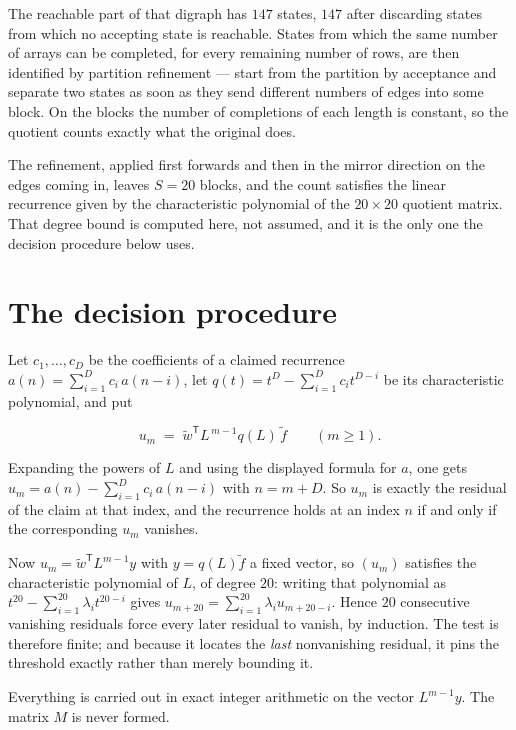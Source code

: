 \documentclass[11pt]{article}
\theoremstyle{definition}
\begin{document}
The reachable part of that digraph has $147$ states, $147$ after discarding states from which no accepting state is reachable. States from which the same number of arrays can be completed, for every remaining number of rows, are then identified by partition refinement --- start from the partition by acceptance and separate two states as soon as they send different numbers of edges into some block. On the blocks the number of completions of each length is constant, so the quotient counts exactly what the original does.

The refinement, applied first forwards and then in the mirror direction on the edges coming in, leaves $S = 20$ blocks, and the count satisfies the linear recurrence given by the characteristic polynomial of the $20 \times 20$ quotient matrix. That degree bound is computed here, not assumed, and it is the only one the decision procedure below uses.

\section{The decision procedure}

Let $c_1,\dots,c_D$ be the coefficients of a claimed recurrence $a(n) = \sum_{i=1}^{D} c_i\,a(n-i)$, let $q(t) = t^{D} - \sum_{i=1}^{D} c_i t^{D-i}$ be its characteristic polynomial, and put

\[u_m \;=\; \tilde w^{\mathsf T} L^{\,m-1} q(L)\,\tilde f \qquad (m \ge 1).\]

Expanding the powers of $L$ and using the displayed formula for $a$, one gets $u_m = a(n) - \sum_{i=1}^{D} c_i\,a(n-i)$ with $n = m + D$. So $u_m$ is exactly the residual of the claim at that index, and the recurrence holds at an index $n$ if and only if the corresponding $u_m$ vanishes.

Now $u_m = \tilde w^{\mathsf T} L^{m-1} y$ with $y = q(L)\tilde f$ a fixed vector, so $(u_m)$ satisfies the characteristic polynomial of $L$, of degree $20$: writing that polynomial as $t^{20} - \sum_{i=1}^{20} \lambda_i t^{20-i}$ gives $u_{m+20} = \sum_{i=1}^{20} \lambda_i u_{m+20-i}$. Hence $20$ consecutive vanishing residuals force every later residual to vanish, by induction. The test is therefore finite; and because it locates the {\itshape last} nonvanishing residual, it pins the threshold exactly rather than merely bounding it.

Everything is carried out in exact integer arithmetic on the vector $L^{m-1}y$. The matrix $M$ is never formed.
\end{document}
